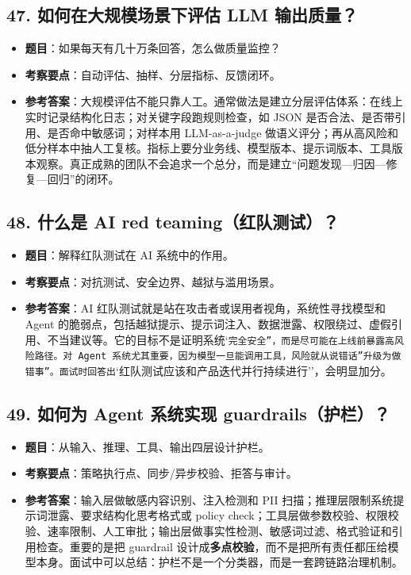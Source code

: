 \subsection{47. 如何在大规模场景下评估 LLM 输出质量？}
\begin{itemize}[leftmargin=2em]
\item \textbf{题目}：如果每天有几十万条回答，怎么做质量监控？
\item \textbf{考察要点}：自动评估、抽样、分层指标、反馈闭环。
\item \textbf{参考答案}：大规模评估不能只靠人工。通常做法是建立分层评估体系：在线上实时记录结构化日志；对关键字段跑规则检查，如 JSON 是否合法、是否带引用、是否命中敏感词；对样本用 LLM-as-a-judge 做语义评分；再从高风险和低分样本中抽人工复核。指标上要分业务线、模型版本、提示词版本、工具版本观察。真正成熟的团队不会追求一个总分，而是建立``问题发现---归因---修复---回归''的闭环。
\end{itemize}

\subsection{48. 什么是 AI red teaming（红队测试）？}
\begin{itemize}[leftmargin=2em]
\item \textbf{题目}：解释红队测试在 AI 系统中的作用。
\item \textbf{考察要点}：对抗测试、安全边界、越狱与滥用场景。
\item \textbf{参考答案}：AI 红队测试就是站在攻击者或误用者视角，系统性寻找模型和 Agent 的脆弱点，包括越狱提示、提示词注入、数据泄露、权限绕过、虚假引用、不当建议等。它的目标不是证明系统`\texttt{完全安全''，而是尽可能在上线前暴露高风险路径。对 Agent 系统尤其重要，因为模型一旦能调用工具，风险就从}\texttt{说错话''升级为}\texttt{做错事''。面试时回答出}`红队测试应该和产品迭代并行持续进行''，会明显加分。
\end{itemize}

\subsection{49. 如何为 Agent 系统实现 guardrails（护栏）？}
\begin{itemize}[leftmargin=2em]
\item \textbf{题目}：从输入、推理、工具、输出四层设计护栏。
\item \textbf{考察要点}：策略执行点、同步/异步校验、拒答与审计。
\item \textbf{参考答案}：输入层做敏感内容识别、注入检测和 PII 扫描；推理层限制系统提示词泄露、要求结构化思考格式或 policy check；工具层做参数校验、权限校验、速率限制、人工审批；输出层做事实性检测、敏感词过滤、格式验证和引用检查。重要的是把 guardrail 设计成\textbf{多点校验}，而不是把所有责任都压给模型本身。面试中可以总结：护栏不是一个分类器，而是一套跨链路治理机制。
\end{itemize}


